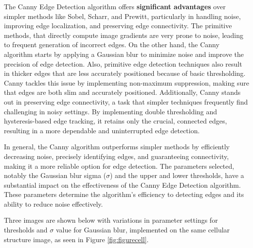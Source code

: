 \documentclass[%
	a4paper, %
	12pt, %
	english, %
	bibtotoc %
]{scrartcl}
\begin{document}
The Canny Edge Detection algorithm offers \textbf{significant advantages} over simpler methods like Sobel, Scharr, and Prewitt, particularly in handling noise, improving edge localization, and preserving edge connectivity. The primitive methods, that directly compute image gradients are very prone to noise, leading to frequent generation of incorrect edges. On the other hand, the Canny algorithm starts by applying a Gaussian blur to minimize noise and improve the precision of edge detection. Also, primitive edge detection techniques also result in thicker edges that are less accurately positioned because of basic thresholding. Canny tackles this issue by implementing non-maximum suppression, making sure that edges are both slim and accurately positioned. Additionally, Canny stands out in preserving edge connectivity, a task that simpler techniques frequently find challenging in noisy settings. By implementing double thresholding and hysteresis-based edge tracking, it retains only the crucial, connected edges, resulting in a more dependable and uninterrupted edge detection.

In general, the Canny algorithm outperforms simpler methods by efficiently decreasing noise, precisely identifying edges, and guaranteeing connectivity, making it a more reliable option for edge detection. The parameters selected, notably the Gaussian blur sigma (\(\sigma\)) and the upper and lower thresholds, have a substantial impact on the effectiveness of the Canny Edge Detection algorithm. These parameters determine the algorithm's efficiency to detecting edges and its ability to reduce noise effectively.

Three images are shown below with variations in parameter settings for thresholds and \(\sigma\) value for Gaussian blur, implemented on the same cellular structure image, as seen in Figure \ref{fig:figurecell}.
\end{document}
